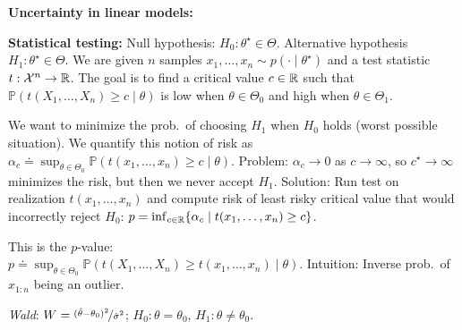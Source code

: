 \documentclass[9pt]{extarticle}
\newenvironment{topic}[1]
{\textbf{\sffamily \colorbox{black}{\rlap{\textbf{\textcolor{white}{#1}}}\hspace{\linewidth}\hspace{-2\fboxsep}}}}
{}
\newenvironment{subtopic}[1]
{\textbf{\sffamily #1:}}
{}
\begin{document}
\begin{multicols*}{3}
\begin{topic}{Uncertainty quantification}
\begin{subtopic}{Uncertainty in linear models}
        \end{subtopic}

        \begin{subtopic}{Statistical testing}
            Null hypothesis: $H_0: \theta^\star \in \Theta$. Alternative hypothesis $H_1: \theta^\star \in
                \Theta$. We are given $n$ samples $x_1, \ldots, x_n \sim p(\cdot \mid \theta^\star)$ and a test
            statistic $t: \mathcal{X}^n \to \mathbb{R}$. The goal is to find a critical value $c \in \mathbb{R}$ such that
            $\mathbb{P}(t(X_1,\ldots,X_n) \geq c \mid \theta)$ is low when $\theta \in \Theta_0$ and high when
            $\theta \in \Theta_1$.

            We want to minimize the prob.\ of choosing $H_1$ when $H_0$ holds (worst possible situation). We
            quantify this notion of risk as $\alpha_c \doteq \sup_{\theta \in \Theta_0} \mathbb{P}(t(x_1,
                \ldots, x_n) \geq c \mid \theta)$. Problem: $\alpha_c \to 0$ as $c \to \infty$, so $c^\star \to
                \infty$ minimizes the risk, but then we never accept $H_1$. Solution: Run test on realization
            $t(x_1, \ldots, x_n)$ and compute risk of least risky critical value that would incorrectly reject
            $H_0$: $p = \inf_{c \in \mathbb{R}} \{ \alpha_c \mid t(x_1, \ldots, x_n) \geq c \}$.

            This is the $p$-value: \\ $p \doteq \sup_{\theta \in \Theta_0} \mathbb{P}(t(X_1, \ldots, X_n) \geq
                t(x_1, \ldots, x_n) \mid \theta)$. Intuition: Inverse prob.\ of $x_{1:n}$ being an outlier.

            \textit{Wald}: $W = \nicefrac{(\hat{\theta} - \theta_0)^2}{\hat{\sigma}^2}$;
            $H_0: \theta = \theta_0$, $H_1: \theta \neq \theta_0$.
        \end{subtopic}


\end{topic}
\end{multicols*}
\end{document}
